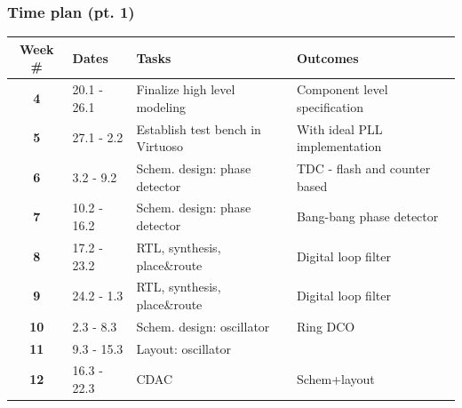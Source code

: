\documentclass[t, screen, aspectratio=43]{beamer}
\begin{document}
\begin{frame}
	\frametitle{Time plan (pt. 1)}
	\begin{table}[htb!]
		\tiny
		\centering
		\vspace{-1em}
		\def\arraystretch{1.5}		
		\setlength\arrayrulewidth{0.75pt}
		\setlength{\tabcolsep}{1em} %
		\begin{tabular}{|c|l|l|l|}
			\hline 
			\rule[-1ex]{0pt}{2.5ex}\cellcolor{gray!40}\textbf{Week \#} & \cellcolor{gray!40}\textbf{Dates} &\cellcolor{gray!40}\textbf{Tasks} & \cellcolor{gray!40}\textbf{Outcomes}\\ 
			\hline 
			\rule[-1ex]{0pt}{2.5ex}\cellcolor{red!40}\textbf{4}&\cellcolor{red!40}20.1 - 26.1 &\cellcolor{red!40}Finalize high level modeling &\cellcolor{red!40}Component level specification\\ 
			\hline 
			\rule[-1ex]{0pt}{2.5ex}\textbf{5}\cellcolor{red!40}&\cellcolor{red!40}27.1 - 2.2 &\cellcolor{red!40}Establish test bench in Virtuoso &\cellcolor{red!40}With ideal PLL implementation\\ 
			\hline 
			\rule[-1ex]{0pt}{2.5ex}\cellcolor{red!40}\textbf{6}&\cellcolor{red!40}3.2 - 9.2&\cellcolor{red!40}Schem. design: phase detector &\cellcolor{red!40}TDC - flash and counter based \\ 
			\hline 
			\rule[-1ex]{0pt}{2.5ex}\cellcolor{red!40}\textbf{7}&\cellcolor{red!40}10.2 - 16.2&\cellcolor{red!40}Schem. design: phase detector &\cellcolor{red!40}Bang-bang phase detector\\ 
			\hline 
			\rule[-1ex]{0pt}{2.5ex}\cellcolor{red!40}\textbf{8}&\cellcolor{red!40}17.2 - 23.2&\cellcolor{red!40}RTL, synthesis, place\&route &\cellcolor{red!40}Digital loop filter\\ 
			\hline 
			\rule[-1ex]{0pt}{2.5ex}\cellcolor{green!40}\textbf{9}&\cellcolor{green!40}24.2 - 1.3&\cellcolor{green!40}RTL, synthesis, place\&\cellcolor{green!40}route & \cellcolor{green!40}Digital loop filter\\ 
			\hline 
			\rule[-1ex]{0pt}{2.5ex}\textbf{10}&2.3 - 8.3& Schem. design: oscillator & Ring DCO\\ 
			\hline 
			\rule[-1ex]{0pt}{2.5ex}\textbf{11}&9.3 - 15.3& Layout: oscillator & \\ 
			\hline 
			\rule[-1ex]{0pt}{2.5ex}\textbf{12}&16.3 - 22.3& CDAC  & Schem+layout\\ 

\end{tabular}
\end{table}
\end{frame}
\end{document}
